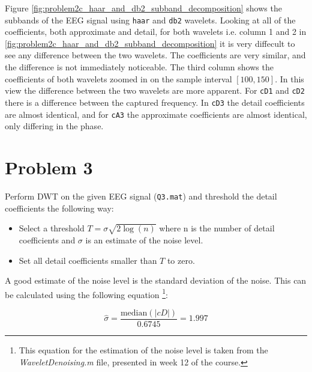 Figure \ref{fig:problem2c_haar_and_db2_subband_decomposition} shows the subbands of the EEG signal using \texttt{haar} and \texttt{db2} wavelets. Looking at all of the coefficients, both approximate and detail, for both wavelets i.e. column 1 and 2 in \ref{fig:problem2c_haar_and_db2_subband_decomposition} it is very diffecult to see any difference between the two wavelets. The coefficients are very similar, and the difference is not immediately noticeable. The third column shows the coefficients of both wavelets zoomed in on the sample interval $[100, 150]$. In this view the difference between the two wavelets are more apparent. For \texttt{cD1} and \texttt{cD2} there is a difference between the captured frequency. In \texttt{cD3} the detail coefficients are almost identical, and for \texttt{cA3} the approximate coefficients are almost identical, only differing in the phase.





\section*{Problem 3} \label{sec:problem3}

\begin{tcolorbox}[colback=blue!5!white,boxrule=0pt,frame empty]
    Perform DWT on the given EEG signal (\verb|Q3.mat|) and threshold the detail coefficients
    the following way:
    \vspace{0.5em}
    \begin{itemize}
        \item Select a threshold $T = \sigma \sqrt{2 \log(n)}$ where n is the number of detail coefficients 
        and $\sigma$ is an estimate of the noise level.
        \item Set all detail coefficients smaller than $T$ to zero.
    \end{itemize}
\end{tcolorbox}


\vspace{0.5cm}

A good estimate of the noise level is the standard deviation of the noise. This can be calculated using the following equation
\footnote{This equation for the estimation of the noise level is taken from the \textit{WaveletDenoising.m} file, presented in week 12 of the course.}:

\begin{equation}
    \hat{\sigma} = \frac{\mathrm{median}(|cD|)}{0.6745} = 1.997
\end{equation}


